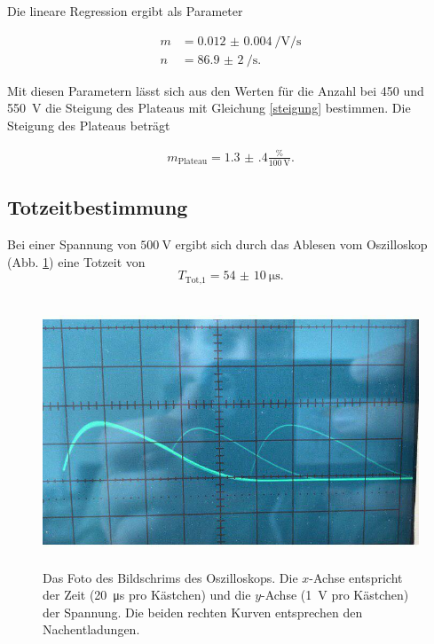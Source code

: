 \noindent Die lineare Regression ergibt als Parameter

\begin{align*} 
   m &= \SI{0.012(4)}{\per\volt\per\second} \\
   n &= \SI{86.9(20)}{\per\second}.
\end{align*}

\noindent Mit diesen Parametern lässt sich aus den Werten für die Anzahl bei \num{450} und \SI{550}{\volt} die Steigung des Plateaus mit Gleichung \eqref{steigung} bestimmen.
Die Steigung des Plateaus beträgt 

\begin{align*} 
    m_\text{Plateau} = \num{1.3(4)} \frac{\si{\percent}}{\SI{100}{\volt}}.
\end{align*}

\subsection{Totzeitbestimmung}

Bei einer Spannung von $\SI{500}{\volt}$ ergibt sich durch das Ablesen vom Oszilloskop (Abb. \ref{foto}) eine Totzeit von 
\begin{equation*}
    T_\text{Tot,1} = \SI{54(10)}{\micro\second}.
\end{equation*}

\begin{figure}
    \centering
    \includegraphics[width=12cm, height=8cm]{build/foto.jpg}
    \caption{Das Foto des Bildschrims des Oszilloskops. Die $x$-Achse entspricht der Zeit (\SI{20}{\micro\second} pro Kästchen) und die $y$-Achse (\SI{1}{\volt} pro Kästchen) der Spannung. Die beiden rechten Kurven entsprechen den Nachentladungen.}
    \label{foto}
\end{figure}

